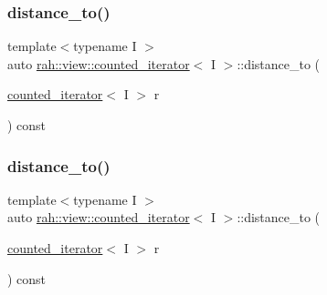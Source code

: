 \mbox{\label{structrah_1_1view_1_1counted__iterator_afee4b1d8525979cc4b711eba9b524f1d}} 
\subsubsection{\texorpdfstring{distance\_to()}{distance\_to()}\hspace{0.1cm}{\footnotesize\ttfamily [1/2]}}
{\footnotesize\ttfamily template$<$typename I $>$ \\
auto \mbox{\hyperlink{structrah_1_1view_1_1counted__iterator}{rah\+::view\+::counted\+\_\+iterator}}$<$ I $>$\+::distance\+\_\+to (\begin{DoxyParamCaption}\item[{\mbox{\hyperlink{structrah_1_1view_1_1counted__iterator}{counted\+\_\+iterator}}$<$ I $>$}]{r }\end{DoxyParamCaption}) const\hspace{0.3cm}{\ttfamily [inline]}}

\mbox{\label{structrah_1_1view_1_1counted__iterator_afee4b1d8525979cc4b711eba9b524f1d}} 
\subsubsection{\texorpdfstring{distance\_to()}{distance\_to()}\hspace{0.1cm}{\footnotesize\ttfamily [2/2]}}
{\footnotesize\ttfamily template$<$typename I $>$ \\
auto \mbox{\hyperlink{structrah_1_1view_1_1counted__iterator}{rah\+::view\+::counted\+\_\+iterator}}$<$ I $>$\+::distance\+\_\+to (\begin{DoxyParamCaption}\item[{\mbox{\hyperlink{structrah_1_1view_1_1counted__iterator}{counted\+\_\+iterator}}$<$ I $>$}]{r }\end{DoxyParamCaption}) const\hspace{0.3cm}{\ttfamily [inline]}}

